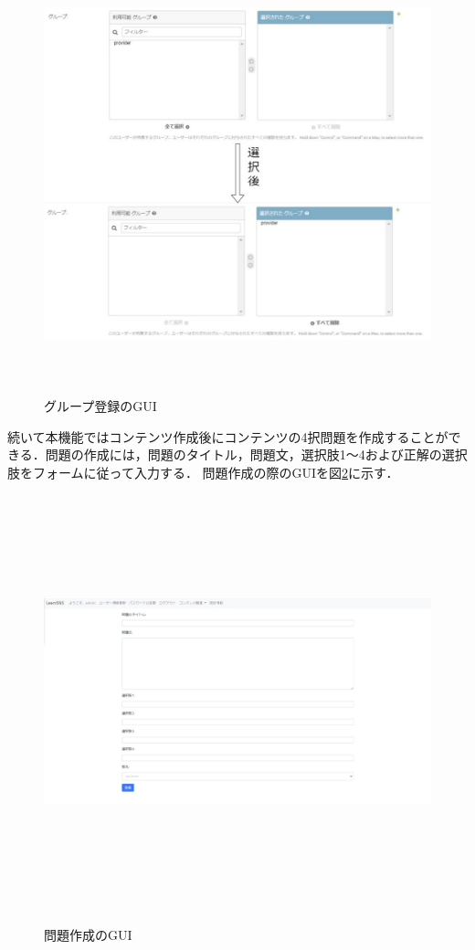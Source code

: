 \begin{figure}[htbp]
    \begin{center}
        \includegraphics[width=13cm,height=12cm,keepaspectratio]{group_register-crop.pdf}\\
    \end{center}
    \caption{グループ登録のGUI}
    \label{group_register}
\end{figure}

\newpage
続いて本機能ではコンテンツ作成後にコンテンツの4択問題を作成することができる．問題の作成には，問題のタイトル，問題文，選択肢1～4および正解の選択肢をフォームに従って入力する．
問題作成の際のGUIを図\ref{create_question}に示す．

\begin{figure}[htbp]
    \begin{center}
        \includegraphics[width=13cm,height=12cm,keepaspectratio]{create_question-crop.pdf}\\
    \end{center}
    \caption{問題作成のGUI}
    \label{create_question}
\end{figure}